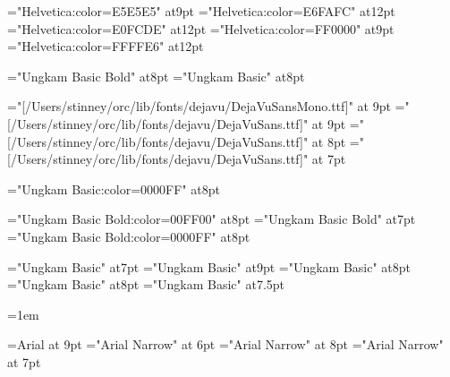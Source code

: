 

\font\hveee="Helvetica:color=E5E5E5" at9pt
\font\hveff="Helvetica:color=E6FAFC" at12pt
\font\hvefd="Helvetica:color=E0FCDE" at12pt
\font\hvfee="Helvetica:color=FF0000" at9pt
\font\hvffe="Helvetica:color=FFFFE6" at12pt

\let\seq\relax
\let\lname\relax
\let\sname\relax
\let\uname\relax
\let\chars\relax
\let\names\relax
\let\glyph\relax
\let\rglyf\relax
\let\image\relax
\let\notes\relax
\let\stags\relax
\let\fseq\relax
\let\fseqc\relax
\let\fseqh\relax
\let\sqdbcun\relax
\let\sqdbpua\relax
\let\sqseq\relax
\let\sqinv\relax
\let\sqchr\relax

\let\imagefloat\relax
\let\imagecaption\relax

\def\ucode#1{\sf\eight\rm}

\let\remfor\relax
\let\Hhhhh\relax

\let\glyf\relax
\let\fchr\relax
\let\fhex\relax
\let\dist\relax
\let\rhex\relax

\let\sl\relax
\let\slc\relax
\let\slcc\relax
\let\cdligh\relax
\let\zatu\relax
\def\diffc{\let\ofspc\relax\pcfee}
\def\diffd{\message{hvfee}\hvfee}

\font\slnmfont="Ungkam Basic Bold" at8pt
\font\sltgfont="Ungkam Basic" at8pt

\font\mono="[/Users/stinney/orc/lib/fonts/dejavu/DejaVuSansMono.ttf]" at 9pt
\font\sans="[/Users/stinney/orc/lib/fonts/dejavu/DejaVuSans.ttf]" at 9pt
\font\sansb="[/Users/stinney/orc/lib/fonts/dejavu/DejaVuSans.ttf]" at 8pt
\font\sansc="[/Users/stinney/orc/lib/fonts/dejavu/DejaVuSans.ttf]" at 7pt

\font\blungkam="Ungkam Basic:color=0000FF" at8pt

\font\slnmfontw="Ungkam Basic Bold:color=00FF00" at8pt
\font\slnmfontx="Ungkam Basic Bold" at7pt
\font\slnmfonty="Ungkam Basic Bold:color=0000FF" at8pt

\font\akafont="Ungkam Basic" at7pt
\font\sldistfont="Ungkam Basic" at9pt
\font\oidfont="Ungkam Basic" at8pt
\font\oidfontx="Ungkam Basic" at8pt
\font\zatufont="Ungkam Basic" at7.5pt

\oidfont{}=1em %

\font\helv=Arial at 9pt
\font\helvx="Arial Narrow" at 6pt
\font\helvy="Arial Narrow" at 8pt
\font\helvz="Arial Narrow" at 7pt

\def\ofs#1#2#3{}
\let\ofspc\pcxxv
\let\redpc\pcfee
\let\newgh\pcblu

\long{}

